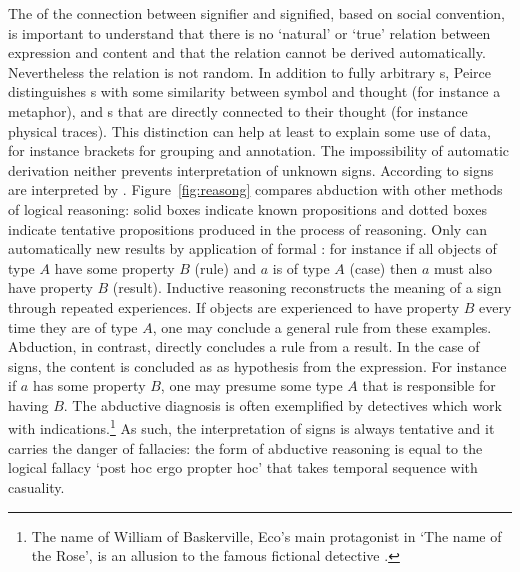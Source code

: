 The  of the connection between signifier and signified, based
on social convention, is important to understand that there is no `natural' or
`true' relation between expression and content and that the relation cannot be
derived automatically.  Nevertheless the relation is not random. In addition to
fully arbitrary s, Peirce distinguishes s
with some similarity between symbol and thought (for instance a metaphor), and
s that are directly connected to their thought (for
instance physical traces). This distinction can help at least to explain some
use of data, for instance brackets for grouping and annotation. The
impossibility of automatic derivation neither prevents interpretation of
unknown signs. According to \textcite[section 1.11]{Eco1984} signs are
interpreted by . Figure~\ref{fig:reasong} compares abduction
with other methods of logical reasoning: solid boxes indicate known
propositions and dotted boxes indicate tentative propositions produced in the
process of reasoning. Only  can automatically
 new results by application of formal : for
instance if all objects of type $A$ have some property $B$ (rule) and $a$ is of
type $A$ (case) then $a$ must also have property $B$ (result). Inductive
reasoning reconstructs the meaning of a sign through repeated experiences. If
objects are experienced to have property $B$ every time they are of type $A$,
one may conclude a general rule from these examples. Abduction, in contrast,
directly concludes a rule from a result. In the case of signs, the content is
concluded as as hypothesis from the expression.  For instance if $a$ has some
property $B$, one may presume some type $A$ that is responsible for having $B$.
The abductive diagnosis is often exemplified by detectives which work with
indications.\footnote{The name of William of Baskerville, Eco's main
protagonist in `The name of the Rose', is an allusion to the famous fictional
detective .} As such, the interpretation of signs is
always tentative and it carries the danger of fallacies: the form of abductive
reasoning is equal to the logical fallacy `post hoc ergo propter hoc' that
takes temporal sequence with casuality.

